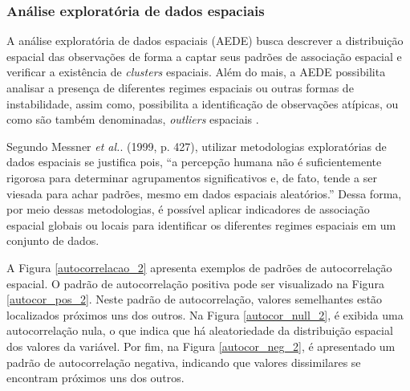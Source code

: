 \documentclass[12pt,a4paper]{article}
\begin{document}
\subsubsection{Análise exploratória de dados espaciais}

A análise exploratória de dados espaciais (AEDE) busca descrever a distribuição espacial das observações de forma a captar seus padrões de associação espacial e verificar a existência de \textit{clusters} espaciais. Além do mais, a AEDE possibilita analisar a presença de diferentes regimes espaciais ou outras formas de instabilidade, assim como, possibilita a identificação de observações atípicas, ou como são também denominadas, \textit{outliers} espaciais \cite{almeida12_g}.

Segundo Messner \textit{et al.}. (1999, p. 427), utilizar metodologias exploratórias de dados espaciais se justifica pois, “a percepção humana não é suficientemente rigorosa para determinar agrupamentos significativos e, de fato, tende a ser viesada para achar padrões, mesmo em dados espaciais aleatórios.” Dessa forma, por meio dessas metodologias, é possível aplicar indicadores de associação espacial globais ou locais para identificar os diferentes regimes espaciais em um conjunto de dados.

A Figura \ref{autocorrelacao_2}	apresenta exemplos de padrões de autocorrelação espacial. O padrão de autocorrelação positiva pode ser visualizado na Figura \ref{autocor_pos_2}. Neste padrão de autocorrelação, valores semelhantes estão localizados próximos uns dos outros. Na Figura \ref{autocor_null_2}, é exibida uma autocorrelação nula, o que indica que há aleatoriedade da distribuição espacial dos valores da variável. Por fim, na Figura \ref{autocor_neg_2}, é apresentado um padrão de autocorrelação negativa, indicando que valores dissimilares se encontram próximos uns dos outros. 
 
\end{document}

